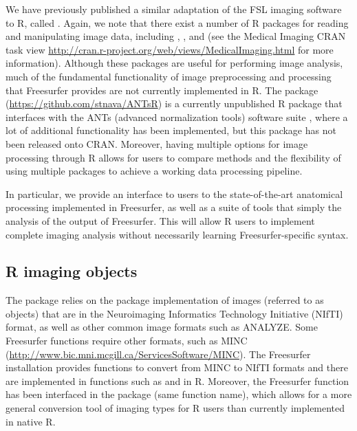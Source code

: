 We have previously published a similar adaptation of the FSL imaging
software \citep{jenkinson_fsl_2012} to R, called 
\citep{muschelli2015fslr}. Again, we note that there exist a number of R
packages for reading and manipulating image data, including
 \citep{bordier_temporal_2011}, 
\citep{modat_rniftyreg:_2013}, and 
\citep{tabelow_statistical_2011} (see the Medical Imaging CRAN task view
\url{http://cran.r-project.org/web/views/MedicalImaging.html} for more
information). Although these packages are useful for performing image
analysis, much of the fundamental functionality of image preprocessing
and processing that Freesurfer provides are not currently implemented in
R. The  package (\url{https://github.com/stnava/ANTsR}) is a
currently unpublished R package that interfaces with the ANTs (advanced
normalization tools) software suite \citep{avants_reproducible_2011},
where a lot of additional functionality has been implemented, but this
package has not been released onto CRAN. Moreover, having multiple
options for image processing through R allows for users to compare
methods and the flexibility of using multiple packages to achieve a
working data processing pipeline.

In particular, we provide an interface to users to the state-of-the-art
anatomical processing implemented in Freesurfer, as well as a suite of
tools that simply the analysis of the output of Freesurfer. This will
allow R users to implement complete imaging analysis without necessarily
learning Freesurfer-specific syntax.

\subsection{R imaging objects}\label{r-imaging-objects}

The  package relies on the 
\citep{whitcher_working_2011} package implementation of images (referred
to as  objects) that are in the Neuroimaging Informatics
Technology Initiative (NIfTI) format, as well as other common image
formats such as ANALYZE. Some Freesurfer functions require other
formats, such as MINC
(\url{http://www.bic.mni.mcgill.ca/ServicesSoftware/MINC}). The
Freesurfer installation provides functions to convert from MINC to NIfTI
formats and there are implemented in functions such as 
and  in R. Moreover, the  Freesurfer
function has been interfaced in the  package (same
function name), which allows for a more general conversion tool of
imaging types for R users than currently implemented in native R.

